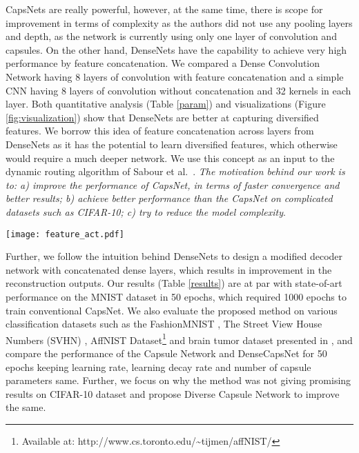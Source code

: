 \documentclass{bmvc2k}
\begin{document}
CapsNets are really powerful, however, at the same time, there is scope for improvement in terms of complexity as the authors did not use any pooling layers and depth, as the network is currently using only one layer of convolution and capsules. On the other hand, DenseNets have the capability to achieve very high performance by feature concatenation. We compared a Dense Convolution Network having 8 layers of convolution with feature concatenation and a simple CNN having 8 layers of convolution without concatenation and 32 kernels in each layer. Both quantitative analysis (Table \ref{param}) and visualizations (Figure \ref{fig:visualization}) show that DenseNets are better at capturing diversified features. We borrow this idea of feature concatenation across layers from DenseNets \cite{densenet} as it has the potential to learn diversified features, which otherwise would require a much deeper network. We use this concept as an input to the dynamic routing algorithm of Sabour et al.\ \cite{capsnet}. \emph{The motivation behind our work is to: a) improve the performance of CapsNet, in terms of faster convergence and better results; b) achieve better performance than the CapsNet on complicated datasets such as CIFAR-10; c) try to reduce the model complexity}. 

\begin{figure*}[t]
\begin{center}
\texttt{[image: feature\_act.pdf]}
\end{center}
   \vspace*{-5mm}
   \caption{Motivation for using dense convolutions with CapsNet: Here (A) and (B) are the feature maps at the same depth from DenseNets and CNN, respectively. It is clear that DenseNets learn clearer discriminative features as compared to CNN.}
\label{fig:visualization}
\end{figure*}
Further, we follow the intuition behind DenseNets to design a modified decoder network with concatenated dense layers, which results in improvement in the reconstruction outputs. Our results (Table \ref{results}) are at par with state-of-art performance on the MNIST dataset \cite{MNIST} in 50 epochs, which required 1000 epochs to train conventional CapsNet. We also evaluate the proposed method on various classification datasets such as the FashionMNIST \cite{FashionMNIST}, The Street View House Numbers (SVHN) \cite{SVHN}, AffNIST Dataset\footnote{Available at: http://www.cs.toronto.edu/\textasciitilde tijmen/affNIST/} and brain tumor dataset presented in \cite{tumor, tumordataset2, capsulepapertumor}, and compare the performance of the Capsule Network and DenseCapsNet for 50 epochs keeping learning rate, learning decay rate and number of capsule parameters same. Further, we focus on why the method was not giving promising results on CIFAR-10 dataset and propose Diverse Capsule Network to improve the same.
\end{document}
